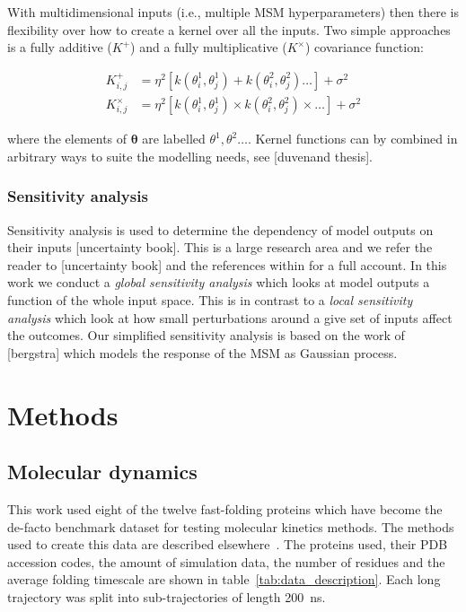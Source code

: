 \documentclass[journal=jacsat,manuscript=article]{achemso}
\begin{document}
With multidimensional inputs (i.e., multiple MSM hyperparameters) then there is flexibility over how to create a kernel over all the inputs. Two simple approaches is a fully additive ($K^{\mathrm{+}}$) and a fully multiplicative ($K^{\mathrm{\times}}$) covariance function: 

\begin{align}
    K^{\mathrm{+}}_{i,j} & = \eta^2  \left [k(\theta^{1}_i, \theta^{1}_j) + k(\theta^{2}_i, \theta^{2}_j) \ldots \right ] + \sigma^2  \label{eqn:plus_kernel} \\ 
    K^{\mathrm{\times}}_{i,j} & = \eta^2  \left [k(\theta^{1}_i, \theta^{1}_j) \times k(\theta^{2}_i, \theta^{2}_j) \times \ldots \right ] + \sigma^2 \label{eqn:mult_kernel}
\end{align}

where the elements of $\bm{\theta}$ are labelled $\theta^{1}, \theta^{2} \ldots$. Kernel functions can by combined in arbitrary ways to suite the modelling needs, see [duvenand thesis]. 

\subsubsection{Sensitivity analysis}

Sensitivity analysis is used to determine the dependency of model outputs on their inputs [uncertainty book]. This is a large research area and we refer the reader to [uncertainty book] and the references within for a full account.  In this work we conduct a \emph{global sensitivity analysis} which looks at model outputs a function of the whole input space. This is in contrast to a \emph{local sensitivity analysis} which look at  how small perturbations around a give set of inputs affect the outcomes.  Our simplified sensitivity analysis is based on the work of [bergstra] which models the response of the MSM as Gaussian process.




\section{Methods}
\subsection{Molecular dynamics}

This work used eight of the twelve fast-folding proteins which have become the de-facto benchmark dataset for testing molecular kinetics methods. The methods used to create this data are described elsewhere~\cite{lindorff-larsen_how_2011}. The proteins used, their PDB accession codes, the amount of simulation data, the number of residues and the average folding timescale are shown in table~\ref{tab:data_description}. Each long trajectory was split into sub-trajectories of length \SI{200}{\nano\second}. 
\end{document}
